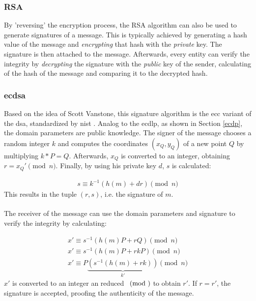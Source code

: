 \subsubsection{RSA}

By 'reversing' the encryption process, the RSA algorithm can also be used to generate signatures of a message.
This is typically achieved by generating a hash value of the message and \textit{encrypting} that hash with the \textit{private} key. The signature is then attached to the
message. Afterwards, every entity can verify the integrity by \textit{decrypting} the signature with the \textit{public} key of the sender, calculating of
the hash of the message and comparing it to the decrypted hash.

\subsubsection{\gls{ecdsa}}

Based on the idea of Scott Vanstone, this signature algorithm is the \gls{ecc} variant of the \gls{dsa}, standardized by \gls{nist} \cite{nistECDSA}.
Analog to the \gls{ecdlp}, as shown in Section \ref{ecdp}, the domain parameters are public knowledge. The signer of the message chooses a random integer $k$ and
computes the coordinates $(x_Q, y_Q)$ of a new point $Q$ by multiplying $k*P = Q$. Afterwards, $x_Q$ is converted to an integer, obtaining $r = x_Q' \pmod n$. Finally,
by using his private key $d$, $s$ is calculated:

\begin{align}\label{ecdsLabel}
s \equiv k^{-1}(h(m)+dr) \pmod n
\end{align}
This results in the tuple $(r,s)$, i.e. the signature of $m$.
\\
\\
The receiver of the message can use the domain parameters and signature to verify the integrity by calculating:

\begin{align*}
 x' \equiv s^{-1}(h(m)P + rQ) \pmod n\\
 x' \equiv s^{-1}(h(m)P + rkP) \pmod n\\
 x' \equiv P \underbrace{(s^{-1}(h(m) + rk))}_{k'} \pmod n
\end{align*}
$x'$ is converted to an integer an reduced $\pmod$ to obtain $r'$. If $r = r'$, the signature is accepted, proofing the authenticity of the message.


%
%


